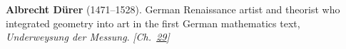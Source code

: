\textbf{Albrecht Dürer} (1471–1528). German Renaissance artist and theorist who integrated geometry into art in the first German mathematics text, \emph{Underweysung der Messung}. \emph{[Ch.~\hyperref[ch:hatmonotile]{29}]}

